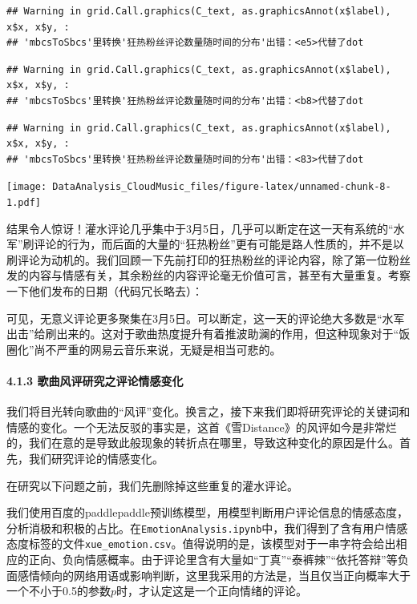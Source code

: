 \documentclass[
]{article}
\begin{document}
\begin{verbatim}
## Warning in grid.Call.graphics(C_text, as.graphicsAnnot(x$label), x$x, x$y, :
## 'mbcsToSbcs'里转换'狂热粉丝评论数量随时间的分布'出错：<e5>代替了dot
\end{verbatim}

\begin{verbatim}
## Warning in grid.Call.graphics(C_text, as.graphicsAnnot(x$label), x$x, x$y, :
## 'mbcsToSbcs'里转换'狂热粉丝评论数量随时间的分布'出错：<b8>代替了dot
\end{verbatim}

\begin{verbatim}
## Warning in grid.Call.graphics(C_text, as.graphicsAnnot(x$label), x$x, x$y, :
## 'mbcsToSbcs'里转换'狂热粉丝评论数量随时间的分布'出错：<83>代替了dot
\end{verbatim}

\texttt{[image: DataAnalysis\_CloudMusic\_files/figure-latex/unnamed-chunk-8-1.pdf]}

结果令人惊讶！灌水评论几乎集中于3月5日，几乎可以断定在这一天有系统的``水军''刷评论的行为，而后面的大量的``狂热粉丝''更有可能是路人性质的，并不是以刷评论为动机的。我们回顾一下先前打印的狂热粉丝的评论内容，除了第一位粉丝发的内容与情感有关，其余粉丝的内容评论毫无价值可言，甚至有大量重复。考察一下他们发布的日期（代码冗长略去）：

可见，无意义评论更多聚集在3月5日。可以断定，这一天的评论绝大多数是``水军出击''给刷出来的。这对于歌曲热度提升有着推波助澜的作用，但这种现象对于``饭圈化''尚不严重的网易云音乐来说，无疑是相当可悲的。

\hypertarget{ux6b4cux66f2ux98ceux8bc4ux7814ux7a76ux4e4bux8bc4ux8bbaux60c5ux611fux53d8ux5316}{%
\paragraph{4.1.3
歌曲风评研究之评论情感变化}\label{ux6b4cux66f2ux98ceux8bc4ux7814ux7a76ux4e4bux8bc4ux8bbaux60c5ux611fux53d8ux5316}}

我们将目光转向歌曲的``风评''变化。换言之，接下来我们即将研究评论的关键词和情感的变化。一个无法反驳的事实是，这首《雪Distance》的风评如今是非常烂的，我们在意的是导致此般现象的转折点在哪里，导致这种变化的原因是什么。首先，我们研究评论的情感变化。

在研究以下问题之前，我们先删除掉这些重复的灌水评论。

我们使用百度的paddlepaddle预训练模型，用模型判断用户评论信息的情感态度，分析消极和积极的占比。在\texttt{EmotionAnalysis.ipynb}中，我们得到了含有用户情感态度标签的文件\texttt{xue\_emotion.csv}。值得说明的是，该模型对于一串字符会给出相应的正向、负向情感概率。由于评论里含有大量如``丁真''``泰裤辣''``依托答辩''等负面感情倾向的网络用语或影响判断，这里我采用的方法是，当且仅当正向概率大于一个不小于0.5的参数\(p\)时，才认定这是一个正向情绪的评论。
\end{document}
